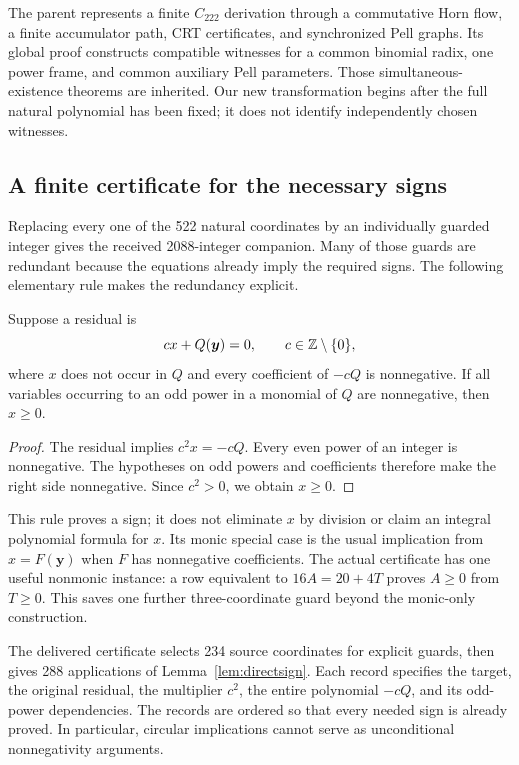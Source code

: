 The parent represents a finite $C_{222}$ derivation through a commutative
Horn flow, a finite accumulator path, CRT certificates, and synchronized
Pell graphs. Its global proof constructs compatible witnesses for a
common binomial radix, one power frame, and common auxiliary Pell
parameters. Those simultaneous-existence theorems are inherited. Our
new transformation begins after the full natural polynomial has been
fixed; it does not identify independently chosen witnesses.

\subsection{A finite certificate for the necessary signs}

Replacing every one of the 522 natural coordinates by an individually
guarded integer gives the received 2088-integer companion. Many of those
guards are redundant because the equations already imply the required
signs. The following elementary rule makes the redundancy explicit.

\begin{lemma}\label{lem:directsign}
Suppose a residual is
\[
 c x+Q(\boldsymbol y)=0,\qquad c\in\mathbb Z\setminus\{0\},
\]
where $x$ does not occur in $Q$ and every coefficient of $-cQ$ is
nonnegative. If all variables occurring to an odd power in a monomial
of $Q$ are nonnegative, then $x\ge0$.
\end{lemma}
\begin{proof}
The residual implies $c^2x=-cQ$. Every even power of an integer is
nonnegative. The hypotheses on odd powers and coefficients therefore
make the right side nonnegative. Since $c^2>0$, we obtain $x\ge0$.
\end{proof}

This rule proves a sign; it does not eliminate $x$ by division or claim
an integral polynomial formula for $x$. Its monic special case is the
usual implication from $x=F(\boldsymbol y)$ when $F$ has nonnegative
coefficients. The actual certificate has one useful nonmonic instance:
a row equivalent to $16A=20+4T$ proves $A\ge0$ from $T\ge0$. This saves
one further three-coordinate guard beyond the monic-only construction.

The delivered certificate selects 234 source coordinates for explicit
guards, then gives 288 applications of Lemma~\ref{lem:directsign}.
Each record specifies the target, the original residual, the multiplier
$c^2$, the entire polynomial $-cQ$, and its odd-power dependencies.
The records are ordered so that every needed sign is already proved.
In particular, circular implications cannot serve as unconditional
nonnegativity arguments.

